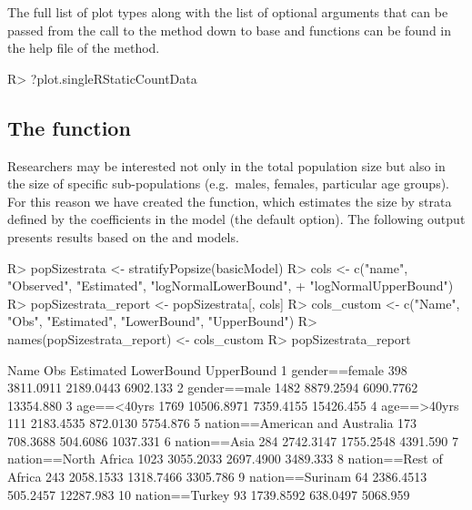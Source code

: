 \documentclass[
]{jss}
\newcommand{\1}{\mathcal{I}} \newcommand{\bZero}{\boldsymbol{0}}
\begin{document}
The full list of plot types along with the list of optional arguments
that can be passed from the call to the  method down to base
 and  functions can be found in the help file
of the  method.

\begin{CodeChunk}
\begin{CodeInput}
R> ?plot.singleRStaticCountData
\end{CodeInput}
\end{CodeChunk}

\subsection[The stratifyPopsize function]{The  function}

Researchers may be interested not only in the total population size but
also in the size of specific sub-populations (e.g.~males, females,
particular age groups). For this reason we have created the
 function, which estimates the size by strata
defined by the coefficients in the model (the default option). The
following output presents results based on the  and
 models.

\begin{CodeChunk}
\begin{CodeInput}
R> popSizestrata <- stratifyPopsize(basicModel)
R> cols <- c("name", "Observed", "Estimated", "logNormalLowerBound", 
+           "logNormalUpperBound")
R> popSizestrata_report <- popSizestrata[, cols]
R> cols_custom <- c("Name", "Obs", "Estimated", "LowerBound", "UpperBound")
R> names(popSizestrata_report) <- cols_custom
R> popSizestrata_report
\end{CodeInput}
\begin{CodeOutput}
                             Name  Obs  Estimated LowerBound UpperBound
1                  gender==female  398  3811.0911  2189.0443   6902.133
2                    gender==male 1482  8879.2594  6090.7762  13354.880
3                     age==<40yrs 1769 10506.8971  7359.4155  15426.455
4                     age==>40yrs  111  2183.4535   872.0130   5754.876
5  nation==American and Australia  173   708.3688   504.6086   1037.331
6                    nation==Asia  284  2742.3147  1755.2548   4391.590
7            nation==North Africa 1023  3055.2033  2697.4900   3489.333
8          nation==Rest of Africa  243  2058.1533  1318.7466   3305.786
9                 nation==Surinam   64  2386.4513   505.2457  12287.983
10                 nation==Turkey   93  1739.8592   638.0497   5068.959
\end{CodeOutput}
\end{CodeChunk}
\end{document}
